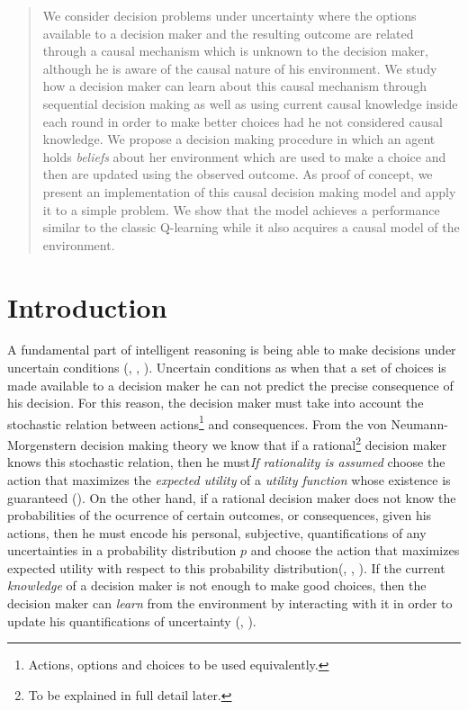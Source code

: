 \documentclass[english,letterpaper,12pt,final]{article}
\theoremstyle{definition}
\begin{document}

\singlespacing
\tableofcontents
\newpage
\begin{abstract}
We consider decision problems under uncertainty where the options available to a decision maker and the resulting outcome are related through a causal mechanism which is unknown to the decision maker, although he is aware of the causal nature of his environment. We study how a decision maker can learn about this causal mechanism through sequential decision making as well as using current causal knowledge inside each round in order to make better choices had he not considered causal knowledge. We propose a decision making procedure in which an agent holds \textit{beliefs} about her environment which are used to make a choice and then are updated using the observed outcome. As proof of concept, we present an implementation of this causal decision making model and apply it to a simple problem. We show that the model achieves a performance similar to the classic Q-learning while it also acquires a causal model of the environment. 
\end{abstract}
\section{Introduction}
\indent A fundamental part of intelligent reasoning is being able to make decisions under uncertain conditions (\cite{danks2014unifying}, \cite{lake2017building}, \cite{pearlwhy}). Uncertain conditions as when that a set of choices is made available to a decision maker he can not predict the precise consequence of his decision. For this reason, the decision maker must take into account the stochastic relation between actions\footnote{Actions, options and choices to be used equivalently.} and consequences. From the von Neumann-Morgenstern decision making theory we know that if a rational\footnote{To be explained in full detail later.} decision maker knows this stochastic relation, then he must\textit{If rationality is assumed} choose the action that maximizes the \textit{expected utility} of a \textit{utility function} whose existence is guaranteed (\cite{von1944theory}). On the other hand, if a rational decision maker does not know the probabilities of the ocurrence of certain outcomes, or consequences, given his actions, then he must encode his personal, subjective, quantifications of any uncertainties in a probability distribution $p$ and choose the action that maximizes expected utility with respect to this probability distribution(\cite{savage1954the}, \cite{bernardo2000bayesian}, \cite{gilboa2009decision}). If the current \textit{knowledge} of a decision maker is not enough to make good choices, then the decision maker can \textit{learn} from the environment by interacting with it in order to update his quantifications of uncertainty (\cite{bernardo2000bayesian}, \cite{peterson2017introduction}).
\end{document}
